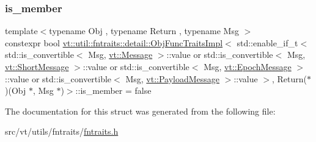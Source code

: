 \subsubsection{\texorpdfstring{is\+\_\+member}{is\_member}}
{\footnotesize\ttfamily template$<$typename Obj , typename Return , typename Msg $>$ \\
constexpr bool \hyperlink{structvt_1_1util_1_1fntraits_1_1detail_1_1_obj_func_traits_impl}{vt\+::util\+::fntraits\+::detail\+::\+Obj\+Func\+Traits\+Impl}$<$ std\+::enable\+\_\+if\+\_\+t$<$ std\+::is\+\_\+convertible$<$ Msg, \hyperlink{namespacevt_a3a3ddfef40b4c90915fa43cdd5f129ea}{vt\+::\+Message} $>$\+::value or std\+::is\+\_\+convertible$<$ Msg, \hyperlink{namespacevt_a1125ac1da6c0bbf141e0ea0739d7602d}{vt\+::\+Short\+Message} $>$\+::value or std\+::is\+\_\+convertible$<$ Msg, \hyperlink{namespacevt_ad67368ffae52d7325002586b41bb150e}{vt\+::\+Epoch\+Message} $>$\+::value or std\+::is\+\_\+convertible$<$ Msg, \hyperlink{namespacevt_a89a92229c5622b855c02c549f83a1a68}{vt\+::\+Payload\+Message} $>$\+::value $>$, Return($\ast$)(Obj $\ast$, Msg $\ast$)$>$\+::is\+\_\+member = false\hspace{0.3cm}{\ttfamily [static]}}



The documentation for this struct was generated from the following file\+:\begin{DoxyCompactItemize}
\item 
src/vt/utils/fntraits/\hyperlink{fntraits_8h}{fntraits.\+h}\end{DoxyCompactItemize}
